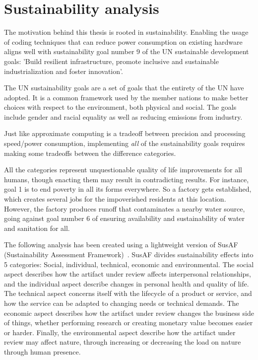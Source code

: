 \section{Sustainability analysis}
The motivation behind this thesis is rooted in sustainability. Enabling the usage of coding techniques that can reduce power consumption on existing hardware aligns well with sustainability goal number 9 of the UN sustainable development goals: 'Build resilient infrastructure, promote inclusive and sustainable industrialization and foster innovation'. 

The UN sustainability goals are a set of goals that the entirety of the UN have adopted. It is a common framework used by the member nations to make better choices with respect to the environment, both physical and social. The goals include gender and racial equality as well as reducing emissions from industry.

Just like approximate computing is a tradeoff between precision and processing speed/power consumption, implementing \emph{all} of the sustainability goals requires making some tradeoffs between the difference categories. 

All the categories represent unquestionable quality of life improvements for all humans, though enacting them may result in contradicting results. For instance, goal 1 is to end poverty in all its forms everywhere. So a factory gets established, which creates several jobs for the impoverished residents at this location. However, the factory produces runoff that contaminates a nearby water source, going against goal number 6 of ensuring availability and sustainability of water and sanitation for all. 

The following analysis has been created using a lightweight version of SusAF (Sustainability Assessment Framework)~\citep{SusAF_website}. SusAF divides sustainability effects into 5 categories: Social, individual, technical, economic and environmental. The social aspect describes how the artifact under review affects interpersonal relationships, and the individual aspect describe changes in personal health and quality of life. The technical aspect concerns itself with the lifecycle of a product or service, and how the service can be adapted to changing needs or technical demands. The economic aspect describes how the artifact under review changes the business side of things, whether performing research or creating monetary value becomes easier or harder. Finally, the environmental aspect describe how the artifact under review may affect nature, through increasing or decreasing the load on nature through human presence.

